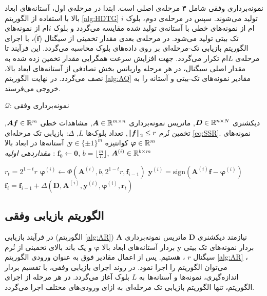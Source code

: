 نمونه‌برداری وفقی شامل ۳ مرحله‌ی اصلی است. ابتدا در مرحله‌ی اول،
آستانه‌های ابعاد بالا با استفاده از الگوریتم
\ref{alg:HDTG}
تولید می‌شوند. سپس در مرحله‌ی دوم، بلوک 
$i$ام
از نمونه‌های خطی با آستانه‌ی تولید شده مقایسه می‌گردد و بلوک 
$i$ام
از نمونه‌های تک بیتی تولید می‌شود. در مرحله‌ی بعدی مقدار تخمینی از سیگنال
($\hat{\bm{f}}$)،
با اجرای الگوریتم بازیابی تک-مرحله‌ای بر روی داده‌های بلوک محاسبه می‌گردد. این فرآیند تا مرحله‌ی 
$L$ام
تکرار می‌گردد. جهت افزایش سرعت همگرایی مقدار تخمین زده شده به مقدار اصلی سیگنال، در هر مرحله واریانس بخش تصادفی از آستانه‌های ابعاد بالا، نصف می‌گردد.
در نهایت الگوریتم
\ref{alg:AQ}
مقادیر نمونه‌های تک-بیتی و آستانه را به خروجی می‌فرستد.

\begin{algorithm}
	\caption{$ \mathcal{Q} $: نمونه‌برداری وفقی}
	\label{alg:AQ}
	\begin{algorithmic}[1]
		\renewcommand{\algorithmicrequire}{\textbf{ورودی:}}
		\renewcommand{\algorithmicensure}{\textbf{خروجی:}}
		\REQUIRE دیکشنری $ \bm{D}\in\mathbb{R}^{n\times N} $, ماتریس نمونه‌برداری $ \bm{A}\in\mathbb{R}^{m\times n} $, مشاهدات خطی $ \bm{Af}\in \mathbb{R}^{m} $, تخمین نُرم $ \left\lVert\bm{f}\right\rVert_{2}\leq r $, تعداد بلوک‌ها $ L $, $\varDelta$: بازیابی تک مرحله‌ای \eqref{eq:SSR}.
		\ENSURE  نمونه‌های کوانتیزه $ \bm{y} \in \lbrace\pm 1\rbrace^{m} $, آستانه‌ها در ابعاد بالا $ \bm{\varphi} \in \mathbb{R}^{m} $
		\\ \textit{مقدار‌دهی اولیه} : $ \bm{f}_{0}\leftarrow \bm{0} $, $ b = \lfloor\frac{m}{L}\rfloor $, $ \bm{A}^{(i)}\in \mathbb{R}^{b\times m}  $
		\begin{latin}
		\STATE $r_{t}=2^{1-t}r$
		\STATE $\bm{\varphi}^{\left(i\right)}\leftarrow \Phi(\bm{A}^{(i)},b,2^{1-t}r,\bm{f}_{i-1}) $
		\STATE $ \bm{y}^{\left(i\right)} = \text{sign}\left(\bm{A}^{(i)}\bm{f}-\bm{\varphi}^{\left(i\right)}\right)$
		\STATE $ \bm{f}_{i} = \bm{f}_{i-1} + \varDelta\left(\bm{D},\bm{A}^{(i)},\bm{y}^{\left(i\right)},\bm{\varphi}^{\left(i\right)},\bm{r}_{t}\right) $
		\ENDFOR
		\end{latin}
	\end{algorithmic} 
\end{algorithm}




\subsection{الگوریتم بازیابی وفقی}
در فرآیند بازیابی (الگوریتم
\ref{alg:AR})
نیازمند دیکشنری
$ \bm{D} $
ماتریس نمونه‌برداری
$ \bm{A} $
بردار نمونه‌های تک بیتی
$ \bm{y} $
بردار آستانه‌های ابعاد بالا
$ \bm{\varphi} $
و یک باند بالای تخمینی از نُرم سیگنال
$ r $
، هستیم. پس از اعمال مقادیر فوق به عنوان ورودی الگوریتم
\ref{alg:AR}
،‌ می‌توان الگوریتم را اجرا نمود. در روند اجرای بازیابی وفقی، با تقسیم بردار اندازه‌گیری،‌ نمونه‌ها و آستانه‌ها به 
$ L $
بلوک آغاز می‌گردد. در هر مرحله از اجرای الگوریتم، تنها الگوریتم بازیابی تک مرحله‌ای به ازای ورودی‌های مختلف اجرا می‌گردد.



